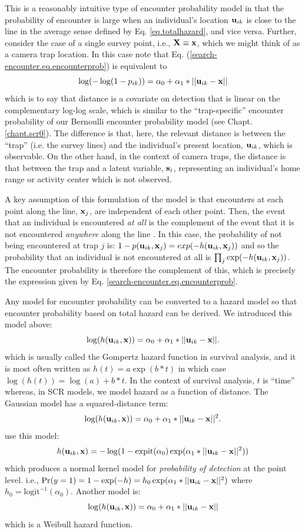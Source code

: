 This is a reasonably intuitive type of encounter probability model in
that the probability of encounter is large when an individual's
location ${\bf u}_{ik}$ is close to the line in the average sense
defined by Eq. \ref{eq.totalhazard}, and vice versa.  Further,
consider the case of a single survey point, i.e., ${\bf X} \equiv {\bf
  x}$, which we might think of as a camera trap location.  In this
case note that Eq. (\ref{search-encounter.eq.encounterprob}) is
equivalent to
\[
\log(-\log(1-p_{ik})) = \alpha_{0} + \alpha_{1}*||{\bf u}_{ik}-{\bf x}||
\]
which is to say that distance is a covariate on detection that is
linear on the complementary log-log scale, which is similar to the
``trap-specific'' encounter probability of our Bernoulli encounter
probability model (see Chapt. \ref{chapt.scr0}).
The difference is that, here, the relevant distance
is between the ``trap'' (i.e. the survey lines) and the individual's
present location, ${\bf u}_{ik}$, which is observable. On the other
hand, in the context of camera traps, the distance is that between the
trap and a latent variable, ${\bf s}_{i}$, representing an
individual's home range or activity center which is not observed.


A key assumption of this formulation of the model is that
encounters at each point along the line, ${\bf x}_{j}$, are
independent of each other point. Then, the event that an individual is
encountered {\it at all} is the complement of the event that it is not
encountered {\it anywhere} along the line \citep{hayes_buckland:1983}.
In this case, the probability of not being encountered at trap $j$ is:
 $1-p({\bf u}_{ik},{\bf x}_{j}) = exp(-h({\bf u}_{ik},{\bf x}_{j}))$
and so the probability that an individual is not encountered at all is
 $\prod_{j} \exp(-h({\bf u}_{ik},{\bf x}_{j}))$. The encounter
probability is therefore the complement of this, which is precisely
the expression given by Eq. \ref{search-encounter.eq.encounterprob}.


Any model for encounter probability can be converted to a hazard model
so that encounter probability based on total hazard can be derived.
We introduced this model above:
\[
\log(h({\bf u}_{ik},{\bf x})) = \alpha_{0} + \alpha_{1}*||{\bf u}_{ik}-{\bf x}||.
\]
which is usually called the Gompertz hazard function in survival
analysis, and it is most often written as $h(t) = a \exp( b*t)$ in which
case $\log(h(t)) = \log(a) + b*t$. In the context of survival
analysis, $t$ is ``time'' whereas, in SCR models, we model hazard as a
function of distance.
The Gaussian model has a  squared-distance term:
\[
\log(h({\bf u}_{ik},{\bf x})) = \alpha_{0} + \alpha_{1}* ||{\bf u}_{ik}-{\bf x}||^2.
\]
 \citet{borchers_efford:2008} use this model:
\[
h({\bf u}_{ik},{\bf x} ) = -\log(1 - \mbox{expit}(\alpha_{0})
\exp( \alpha_{1}*||{\bf u}_{ik} - {\bf x}||^2 ) )
\]
which produces a normal kernel model for {\it probability of
  detection} at the point level. i.e., $\Pr(y=1) = 1-\exp(-h) = h_{0}
\exp( \alpha_{1}*||{\bf u}_{ik} - {\bf x}||^2 )$ where $h_{0} =
\mbox{logit}^{-1}(\alpha_{0})$.
Another model is:
\[
\log(h({\bf u}_{ik},{\bf x})) = \alpha_{0} + \alpha_{1}*||{\bf u}_{ik}-{\bf x}||
\]
which is a Weibull hazard function.



